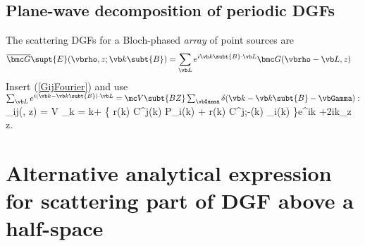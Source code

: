 \documentclass[letterpaper]{article}
\begin{document}
\subsection{Plane-wave decomposition of periodic DGFs}

The scattering DGFs for a Bloch-phased \textit{array} of point sources
are
\begin{align*}
  \overline{\bmc G}\supt{E}(\vbrho, z; \vb k\subt{B}) 
&= \sum_{\vb L} e^{i\vb k\subt{B}\cdot \vb L}\bmc G(\vbrho-\vb L, z)
\end{align*}
Insert (\ref{GijFourier}) and use
$ \sum_{\vb L} e^{i(\vb k - \vb k\subt{B})\cdot \vb L}
   = \mc V\subt{BZ}\sum_{\vbGamma} \delta(\vb k-\vb k\subt{B}-\vbGamma):
$
{ _{ij}(\vbrho, z) =
  \mc V \sum_{\vb k = \vb k+\vbGamma}
    \bigg\{   r(\vb k) C^{j}(\vb k) P_i(\vb k)
            + r(\vb k) C^{j;-}(\vb k) _i(\vb k)
    \bigg\}e^{i\vb k \cdot \vbrho +2ik_z z}.
}

\newpage
\section{Alternative analytical expression for scattering part of
         DGF above a half-space}
\end{document}
